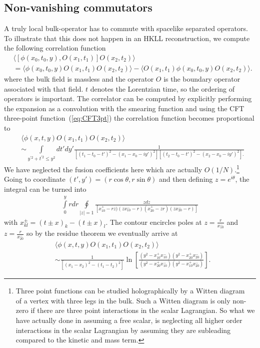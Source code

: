 \documentclass{PoS}
\newcommand{\LT}{\left[}
\newcommand{\RT}{\right]}
\begin{document}
\subsection{Non-vanishing commutators}
A truly local bulk-operator has to commute with spacelike separated operators. To illustrate that this does not happen in an HKLL reconstruction, we compute the following correlation function
\begin{align}
&\langle \LT \phi(x_0,t_0,y),O(x_1,t_1)\RT O(x_2,t_2)\rangle \nonumber\\
&= \langle \phi(x_0,t_0,y)O(x_1,t_1) O(x_2,t_2)\rangle - \langle  O(x_1,t_1) \phi(x_0,t_0,y) O(x_2,t_2)\rangle.
\end{align}
where the bulk field is massless and the operator $O$ is the boundary operator associated with that field. $t$ denotes the Lorentzian time, so the ordering of operators is important. The correlator can be computed by explicitly performing the expansion as a convolution with the smearing function and using the CFT three-point function~(\ref{eq:CFT3pt}) the correlation function becomes proportional to
\begin{align}
 &\langle \phi(x,t,y)O(x_1,t_1) O(x_2,t_2)\rangle\nonumber\\
 &\sim \int\limits_{y^{'2} + t^{'2}\leq y^2} dt' dy' \frac{ 1}{ \LT (t_1-t_0-t')^2-(x_1-x_0-iy')^2\RT \LT (t_2-t_0-t')^2 - (x_2-x_0 - iy')^2\RT.} 
\end{align}
We have neglected the fusion coefficients here which are actually $O(1/N)$.\footnote{Three point functions can be studied holographically by a Witten diagram~\cite{Witten:1998qj} of a vertex with three legs in the bulk. Such a Witten diagram is only non-zero if there are three point interactions in the scalar Lagrangian. So what we have actually done in assuming a free scalar, is neglecting all higher order interactions in the scalar Lagrangian by assuming they are subleading compared to the kinetic and mass term.}  Going to coordinate $(t',y')=(r\cos\theta,r\sin\theta)$ and then defining $z=e^{i\theta}$, the integral can be turned into
\begin{align}
\int\limits_0^y rdr \oint\limits_{\left|z\right|=1} \frac{zdz}{ \LT x_{10}^+ -rz)(zx_{10}^- -r)(x_{20}^+ -zr)(zx_{20}^- - r)\RT}
\end{align}
with $ x_{kl}^{\pm} = (t\pm x)_k - (t\pm x)_l$. The contour encircles poles at $z=\frac{r}{x_{10}^-}$ and $z=\frac{r}{x_{20}^-}$ so by the residue theorem we eventually arrive at
\begin{align}
 &\langle \phi(x,t,y)O(x_1,t_1) O(x_2,t_2)\rangle\nonumber\\
 &\sim \frac{ 1}{\LT (x_1-x_2)^2 - (t_1-t_2)^2\RT} \ln\LT\frac{ (y^2-x_{10}^+x_{10}^-) (y^2-x_{20}^+x_{20}^-)}{ (y^2-x_{20}^+x_{10}^-) (y^2-x_{10}^+x_{20}^-)}\RT.
\end{align}
\end{document}
